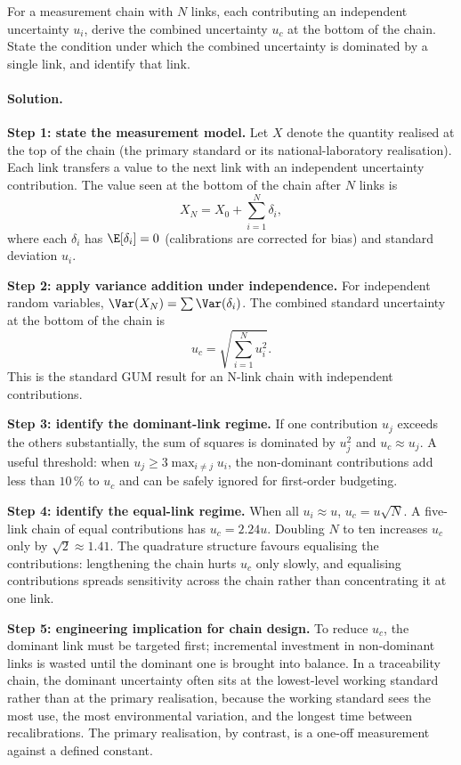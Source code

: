 \begin{exercise}
For a measurement chain with $N$ links, each contributing an
independent uncertainty $u_i$, derive the combined uncertainty $u_c$
at the bottom of the chain. State the condition under which the
combined uncertainty is dominated by a single link, and identify
that link.

\paragraph{Solution.}
\textbf{Step 1: state the measurement model.} Let $X$ denote the
quantity realised at the top of the chain (the primary standard or
its national-laboratory realisation). Each link transfers a value
to the next link with an independent uncertainty contribution. The
value seen at the bottom of the chain after $N$ links is
\[
X_{N} = X_{0} + \sum_{i=1}^{N} \delta_{i},
\]
where each $\delta_{i}$ has $\E[\delta_{i}] = 0$ (calibrations are
corrected for bias) and standard deviation $u_{i}$.

\textbf{Step 2: apply variance addition under independence.} For
independent random variables, $\Var(X_{N}) = \sum \Var(\delta_{i})$.
The combined standard uncertainty at the bottom of the chain is
\[
u_{c} = \sqrt{\sum_{i=1}^{N} u_{i}^{2}}.
\]
This is the standard GUM result for an N-link chain with
independent contributions.

\textbf{Step 3: identify the dominant-link regime.} If one
contribution $u_{j}$ exceeds the others substantially, the sum of
squares is dominated by $u_{j}^{2}$ and $u_{c} \approx u_{j}$. A
useful threshold: when $u_{j} \geq 3 \max_{i \neq j} u_{i}$, the
non-dominant contributions add less than $10\,\%$ to $u_{c}$ and
can be safely ignored for first-order budgeting.

\textbf{Step 4: identify the equal-link regime.} When all $u_{i}
\approx u$, $u_{c} = u\sqrt{N}$. A five-link chain of equal
contributions has $u_{c} = 2.24 u$. Doubling $N$ to ten increases
$u_{c}$ only by $\sqrt{2} \approx 1.41$. The quadrature structure
favours equalising the contributions: lengthening the chain hurts
$u_{c}$ only slowly, and equalising contributions spreads
sensitivity across the chain rather than concentrating it at one
link.

\textbf{Step 5: engineering implication for chain design.} To
reduce $u_{c}$, the dominant link must be targeted first;
incremental investment in non-dominant links is wasted until the
dominant one is brought into balance. In a traceability chain, the
dominant uncertainty often sits at the lowest-level working
standard rather than at the primary realisation, because the
working standard sees the most use, the most environmental
variation, and the longest time between recalibrations. The primary
realisation, by contrast, is a one-off measurement against a
defined constant.


\end{exercise}

